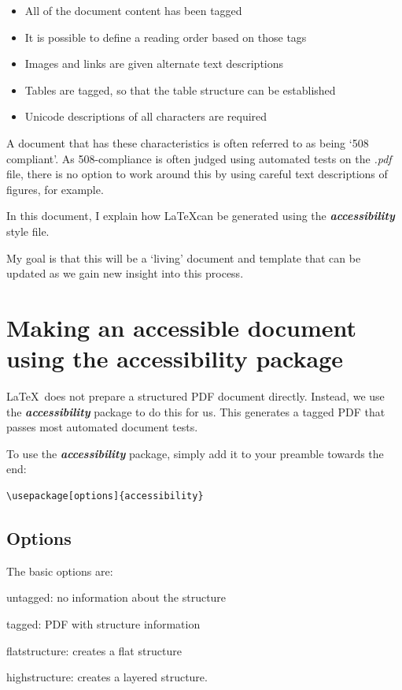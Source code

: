 \documentclass[10pt,onecolumn]{article}
\newcommand{\fn}[1]{\emph{#1}}
\newcommand{\packagename}[1]{\textbf{\emph{#1}}}
\begin{document}
\begin{itemize}
\item All of the document content has been tagged
\item It is possible to define a reading order based on those tags
\item Images and links are given alternate text descriptions
\item Tables are tagged, so that the table structure can be established
\item Unicode descriptions of all characters are required
\end{itemize}

A document that has these characteristics is often referred to as being `508 compliant'. As 508-compliance is often judged using automated tests on the \fn{.pdf} file, there is no option to work around this by using careful text descriptions of figures, for example.

In this document, I explain how \LaTeX can be generated using the \packagename{accessibility} style file.

My goal is that this will be a `living' document and template that can be updated as we gain new insight into this process.

\section{Making an accessible document using the accessibility package}
\LaTeX\ does not prepare a structured PDF document directly. Instead, we use the \packagename{accessibility} package to do this for us. This generates a tagged PDF that passes most automated document tests.

To use the \packagename{accessibility} package, simply add it to your preamble towards the end:

\begin{lstlisting}[language={[LaTeX]TeX}]
\usepackage[options]{accessibility}
\end{lstlisting}

\subsection{Options}
The basic options are:
\begin{description}
\item{untagged}: no information about the structure
\item tagged: PDF with structure information
\item flatstructure: creates a flat structure
\item	highstructure: creates a layered structure.
\end{description}
\end{document}
